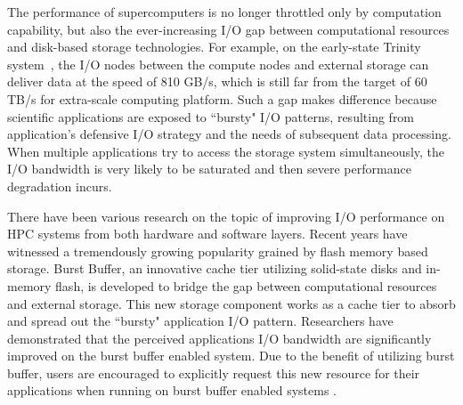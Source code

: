 The performance of supercomputers is no longer throttled only by computation capability,
but also the ever-increasing I/O gap
between computational resources and disk-based storage technologies.
For example, on the early-state Trinity system~\cite{TrinitySystem}, the I/O nodes between
the compute nodes and external storage can deliver data at  the speed of 810 GB/s, 
which is still far from the target of 60 TB/s for extra-scale computing platform\cite{Shalf:HPCCS:2010}.
Such a gap makes difference because scientific applications are exposed to
``bursty" I/O patterns\cite{Carns:MSST:2011, Kim:PDSW:2010},
resulting from application's
defensive I/O strategy\cite{Latham:CSD:2012, Naik:ICPPW:2009, Dennis:CUG:2009}
and the needs of subsequent data processing.
When multiple applications try to access the storage system simultaneously,
the I/O bandwidth is very likely to be saturated and then severe performance degradation incurs.


There have been various research on the topic of improving I/O performance on HPC systems from
both hardware and software layers.
Recent years have witnessed a tremendously growing popularity grained by flash memory  based storage.
Burst Buffer, an innovative cache tier utilizing solid-state disks and in-memory flash, 
is developed to bridge the gap between computational resources and external storage.
This new storage component works as a cache tier to absorb and spread out
the ``bursty" application I/O pattern\cite{Bent:HBP:2011, Grider:EXA:2010}.
Researchers\cite{Liu:MSST:2012} have demonstrated that the perceived applications I/O
bandwidth are significantly improved on the burst buffer enabled system.
Due to the benefit of utilizing burst buffer,
users are encouraged to explicitly request this new resource for 
their applications when running on burst buffer enabled systems \cite{apex-workflow}.

